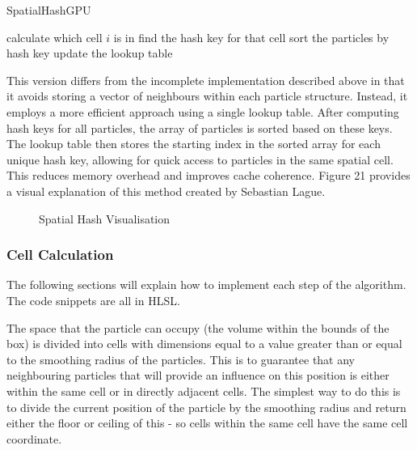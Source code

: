 \documentclass[a4paper, 12pt]{article}
\newcommand{\wideimage}[2][]{%
  \makebox[\textwidth][c]{\texttt{[image: \#2]}}%
}
\begin{document}
    \begin{algorithm}
        \caption{SpatialHashGPU}
        \begin{algorithmic}[1]
                \State calculate which cell $i$ is in
                \State find the hash key for that cell
            \EndFor
                \State sort the particles by hash key
            \EndFor
                \State update the lookup table
            \EndFor
        \end{algorithmic}
    \end{algorithm}

    This version differs from the incomplete implementation described above in that it avoids storing a vector of neighbours within each particle structure. Instead, it employs a more efficient approach using a single lookup table. After computing hash keys for all particles, the array of particles is sorted based on these keys. The lookup table then stores the starting index in the sorted array for each unique hash key, allowing for quick access to particles in the same spatial cell. This reduces memory overhead and improves cache coherence. Figure 21 provides a visual explanation of this method created by Sebastian Lague\cite{lague}.
    
    \begin{figure}[H]
        \wideimage[]{spatialHashVisualisation.png}
        \caption{Spatial Hash Visualisation \cite{lague}}
    \end{figure}

    \subsubsection{Cell Calculation}

    The following sections will explain how to implement each step of the algorithm. The code snippets are all in HLSL.

    The space that the particle can occupy (the volume within the bounds of the box) is divided into cells with dimensions equal to a value greater than or equal to the smoothing radius of the particles. This is to guarantee that any neighbouring particles that will provide an influence on this position is either within the same cell or in directly adjacent cells. The simplest way to do this is to divide the current position of the particle by the smoothing radius and return either the floor or ceiling of this - so cells within the same cell have the same cell coordinate.
\end{document}
